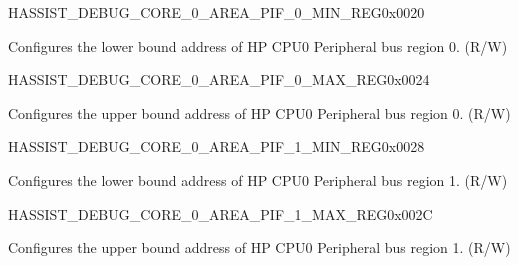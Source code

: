 \begin{register}{H}{ASSIST\_DEBUG\_CORE\_0\_AREA\_PIF\_0\_MIN\_REG}{0x0020}\label{regdesc:ASSISTDEBUGCORE0AREAPIF0MINREG}
%
\regnewline%
\begin{regdesc}\begin{reglist}
\label{fielddesc:ASSISTDEBUGCORE0AREAPIF0MIN}\item [ASSIST\_DEBUG\_CORE\_0\_AREA\_PIF\_0\_MIN] Configures the lower bound address of HP CPU0 Peripheral bus region 0. (R/W)
\end{reglist}\end{regdesc}
\end{register}


\begin{register}{H}{ASSIST\_DEBUG\_CORE\_0\_AREA\_PIF\_0\_MAX\_REG}{0x0024}\label{regdesc:ASSISTDEBUGCORE0AREAPIF0MAXREG}
%
\regnewline%
\begin{regdesc}\begin{reglist}
\label{fielddesc:ASSISTDEBUGCORE0AREAPIF0MAX}\item [ASSIST\_DEBUG\_CORE\_0\_AREA\_PIF\_0\_MAX] Configures the upper bound address of HP CPU0 Peripheral bus region 0. (R/W)
\end{reglist}\end{regdesc}
\end{register}


\begin{register}{H}{ASSIST\_DEBUG\_CORE\_0\_AREA\_PIF\_1\_MIN\_REG}{0x0028}\label{regdesc:ASSISTDEBUGCORE0AREAPIF1MINREG}
%
\regnewline%
\begin{regdesc}\begin{reglist}
\label{fielddesc:ASSISTDEBUGCORE0AREAPIF1MIN}\item [ASSIST\_DEBUG\_CORE\_0\_AREA\_PIF\_1\_MIN] Configures the lower bound address of HP CPU0 Peripheral bus region 1. (R/W)
\end{reglist}\end{regdesc}
\end{register}


\begin{register}{H}{ASSIST\_DEBUG\_CORE\_0\_AREA\_PIF\_1\_MAX\_REG}{0x002C}\label{regdesc:ASSISTDEBUGCORE0AREAPIF1MAXREG}
%
\regnewline%
\begin{regdesc}\begin{reglist}
\label{fielddesc:ASSISTDEBUGCORE0AREAPIF1MAX}\item [ASSIST\_DEBUG\_CORE\_0\_AREA\_PIF\_1\_MAX] Configures the upper bound address of HP CPU0 Peripheral bus region 1. (R/W)
\end{reglist}\end{regdesc}
\end{register}


